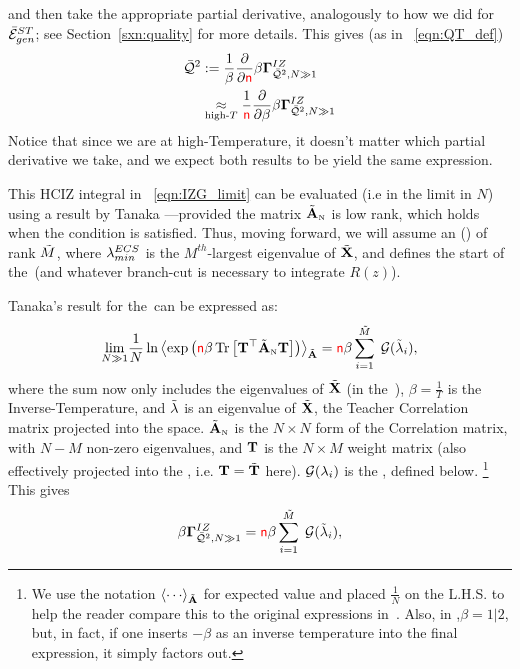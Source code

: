and then take the appropriate partial derivative,
analogously to how we did for $\bar{\mathcal{E}}^{ST}_{gen}$; see Section~\ref{sxn:quality} for more details.
This gives (as in \EQN~\ref{eqn:QT_def})
\begin{align}
\label{eqn:IZG_generate_Q2}
\QT &:= \frac{1}{\beta}\frac{\partial }{\partial \ND}\IZGINF  \\ 
&\underset{\text{high-}T}{\approx}
\frac{1}{\ND}\frac{\partial }{\partial \beta}\IZGINF 
\end{align}
Notice that since we are at high-Temperature, it doesn't matter which partial derivative we take,
and we expect both results to be yield the same expression.

This HCIZ integral in \EQN~\ref{eqn:IZG_limit} can be evaluated
(i.e in the \largeN limit in $N$) using a result by Tanaka ---provided
the matrix $\tilde{\mathbf{A}}_{\text{\tiny N}}$ is low rank, which holds when the \TRACELOG condition is satisfied.
Thus, moving forward, we will assume an
\EffectiveCorrelationSpace (\ECS) of rank $\tilde{M}$, where $\lambda^{ECS}_{min}$ is the $M^{th}$-largest eigenvalue of $\tilde{\mathbf{X}}$,
and defines the start of the~\ECS (and whatever branch-cut is necessary to integrate $R(z)$).

Tanaka's result for the~\ECS can be expressed as:
\begin{equation}
  \label{eqn:tanaka_result}
  \underset{N\gg 1}{\lim}\frac{1}{N}\ln
\Expected[\AECS]{\exp\left(\ND\beta \Trace{\TMAT^{\top}\AECSN\TMAT}\right)}
  =\ND\beta\sum\limits_{i=1}^{\MECS}\;\GNECSI,
\end{equation}
where the sum now only includes the eigenvalues of $\tilde{\mathbf{X}}$ (in the~\ECS), $\beta=\tfrac{1}{T}$
is the Inverse-Temperature, and $\tilde{\lambda}$ is an eigenvalue of $\tilde{\mathbf{X}}$, the Teacher
Correlation matrix projected into the \ECS space.
$\tilde{\mathbf{A}}_{\text{\tiny N}}$ is the $N \times N$ form of the \Student Correlation matrix,
with $N-M$ non-zero eigenvalues, and ${\mathbf{T}}$ is the $N\times M$ \Teacher  weight matrix
(also effectively projected into the \ECS, i.e. ${\mathbf{T}}=\tilde{\mathbf{T}}$ here).
$\mathcal{G}(\lambda_{i})$ is the \GEN, defined below.
\footnote{We use the notation $\Expected[\AECS]{\cdots}$ for expected value and placed $\tfrac{1}{N}$ on the L.H.S.
to help the reader compare this to the original expressions in~\cite{Tanaka2007, Tanaka2008}.
Also,  in \cite{Tanaka2007, Tanaka2008},$\beta=1|2$, but, in fact, if one inserts $-\beta$ as an inverse temperature into the final expression, it simply factors out.}
This gives
\begin{equation}
\label{eqn:tanaka_result2}
\IZGINF = \ND\beta\sum\limits_{i=1}^{\MECS}\;\GNECSI,
\end{equation}


